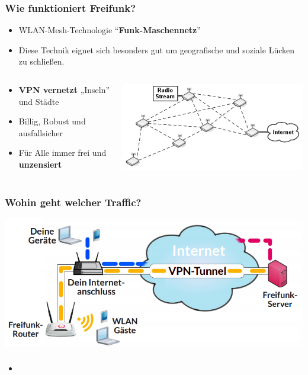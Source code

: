 \begin{frame}
\frametitle{Wie funktioniert Freifunk?}
\begin{itemize}
	\item WLAN-Mesh-Technologie “\textbf{Funk-Maschennetz}”
	\item Diese Technik eignet sich besonders gut um geografische und soziale Lücken zu schließen.
\end{itemize}
\begin{columns}[c]   
	\begin{column}[T]{0.4\textwidth}     
		\begin{itemize}
			\item \textbf{VPN vernetzt} „Inseln” und Städte
			\item Billig, Robust und ausfallsicher
			\item Für Alle immer frei und \textbf{unzensiert}
		\end{itemize}
	\end{column} 
		\begin{column}[T]{0.5\textwidth}     
			\includegraphics[width=\textwidth]{images/mesh_uebersicht.png}   
		\end{column}
	\end{columns} 
\end{frame}


\begin{frame}
\frametitle{Wohin geht welcher Traffic?}
	\includegraphics[scale=0.4]{images/personal_setup.png}
\end{frame}



\begin{frame}
\frametitle{}
\begin{itemize}
\item 
\end{itemize}
\end{frame}
